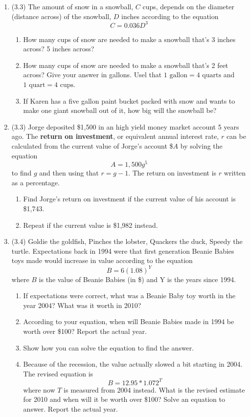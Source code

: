 \documentclass[12pt]{article}
\begin{document}
\begin{enumerate}
\item (3.3) The amount of snow in a snowball, $C$ cups, depends on the diameter (distance across) of the snowball, $D$ inches according to the equation $$C = 0.036D^3$$
\begin{enumerate}
\item How many cups of snow are needed to make a snowball that's 3 inches across? 5 inches across?
\item How many cups of snow are needed to make a snowball that's 2 feet across?
Give your answer in gallons.  Usel that $1 \text{ gallon} = 4 \text{ quarts}$ and $1 \text{ quart} = 4 \text{ cups}$.
\item  If Karen has a five gallon paint bucket packed with snow and wants to make one giant snowball out of it, how big will the snowball be? 
\end{enumerate}

\item (3.3)  Jorge deposited \$1,500 in an high yield money market account 5 years ago.  The \textbf{return on investment}, or equivalent annual interest rate, $r$ can be calculated from the current value of Jorge's account \$$A$ by solving the equation
$$A = 1,500g^5$$ to find $g$ and then using that $r= g-1$.  The return on investment is $r$ written as a percentage.
\begin{enumerate}
\item Find Jorge's return on investment if the current value of his account is \$1,743.
\item Repeat if the current value is \$1,982 instead.
\end{enumerate}

\item (3.4) Goldie the goldfish, Pinches the lobster, Quackers the duck, Speedy the turtle.  Expectations back in 1994 were that first generation Beanie Babies toys made would increase in value according to the equation $$B = 6(1.08)^Y$$ where $B$ is the value of Beanie Babies (in \$) and Y is the years since 1994.
\begin{enumerate}
\item If expectations were correct, what was a Beanie Baby toy worth in the year 2004?  What was it worth in 2010?
\item According to your equation, when will Beanie Babies made in 1994 be worth over \$100?  Report the actual year.
\item Show how you can solve the equation to find the answer.
\item Because of the recession, the value actually slowed a bit starting in 2004.  The revised equation is $$B = 12.95 \ast 1.072^T$$ where now $T$ is measured from 2004 instead.  What is the revised estimate for 2010 and when will it be worth over \$100?  Solve an equation to answer. Report the actual year.
\end{enumerate} 



\end{enumerate}
\end{document}
